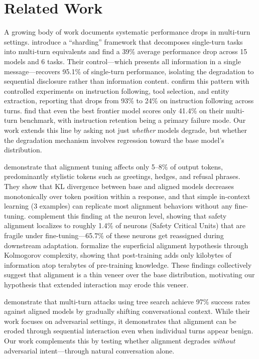 \section{Related Work}
\label{sec:related}

A growing body of work documents systematic performance drops in multi-turn settings. \citet{laban2025lost} introduce a ``sharding'' framework that decomposes single-turn tasks into multi-turn equivalents and find a 39\% average performance drop across 15 models and 6 tasks. Their \concat control---which presents all information in a single message---recovers 95.1\% of single-turn performance, isolating the degradation to sequential disclosure rather than information content. \citet{myung2026conversational} confirm this pattern with controlled experiments on instruction following, tool selection, and entity extraction, reporting that \gptmini drops from 93\% to 24\% on instruction following across turns. \citet{sirdeshmukh2025multichallenge} find that even the best frontier model scores only 41.4\% on their multi-turn benchmark, with instruction retention being a primary failure mode. Our work extends this line by asking not just \emph{whether} models degrade, but whether the degradation mechanism involves regression toward the base model's distribution.

\citet{lin2024urial} demonstrate that alignment tuning affects only 5--8\% of output tokens, predominantly stylistic tokens such as greetings, hedges, and refusal phrases. They show that KL divergence between base and aligned models decreases monotonically over token position within a response, and that simple in-context learning (3 examples) can replicate most alignment behaviors without any fine-tuning. \citet{li2024ssah} complement this finding at the neuron level, showing that safety alignment localizes to roughly 1.4\% of neurons (Safety Critical Units) that are fragile under fine-tuning---65.7\% of these neurons get reassigned during downstream adaptation. \citet{vergara2026superficial} formalize the superficial alignment hypothesis through Kolmogorov complexity, showing that post-training adds only kilobytes of information atop terabytes of pre-training knowledge. These findings collectively suggest that alignment is a thin veneer over the base distribution, motivating our hypothesis that extended interaction may erode this veneer.

\citet{li2026multiturn_jailbreak} demonstrate that multi-turn attacks using tree search achieve 97\% success rates against aligned models by gradually shifting conversational context. While their work focuses on adversarial settings, it demonstrates that alignment can be eroded through sequential interaction even when individual turns appear benign. Our work complements this by testing whether alignment degrades \emph{without} adversarial intent---through natural conversation alone.

